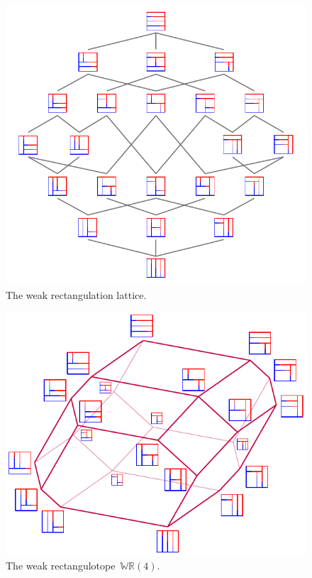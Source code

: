 \documentclass{amsart}
\theoremstyle{definition}
\newcommand{\polytope}[1]{\mathds{#1}} %
\newcommand{\WRP}{\polytope{WR}} %
\begin{document}
\begin{figure}
	\centerline{\includegraphics[scale=1.05]{weakRectangulationLattice}}
	\caption{The weak rectangulation lattice.}
	\label{fig:weakRectangulationLattice}
\end{figure}
\begin{figure}
	\centerline{\includegraphics[scale=1.05]{weakRectangulotopeLabeled}}
	\caption{The weak rectangulotope~$\WRP(4)$.}
        \label{fig:weakRectangulotope}
\end{figure}
\end{document}
